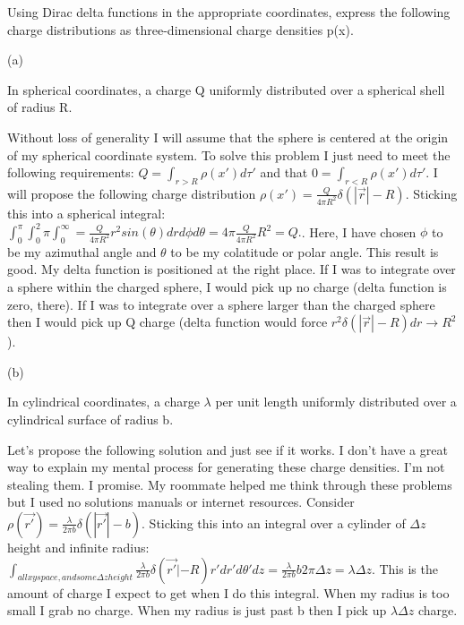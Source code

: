 \begin{homeworkProblem}

Using Dirac delta functions in the appropriate coordinates, express the following 
charge distributions as three-dimensional charge densities p(x). 

\begin{homeworkSection}{(a)} 

In spherical coordinates, a charge Q uniformly distributed over a spherical 
shell of radius R. 

Without loss of generality I will assume that the sphere is centered at the origin of my spherical coordinate system. To solve this problem I just need to meet the following requirements: $Q = \int_{r>R} \rho(x')d\tau'$ and that $0 = \int_{r<R} \rho(x')d\tau '$. I will propose the following charge distribution $\rho(x') = \frac{Q}{4\pi R^2} \delta(|\vec{r}|-R)$. Sticking this into a spherical integral: $\int_0^\pi \int_0^2\pi \int_0^\infty = \frac{Q}{4\pi R^2} r^2 sin(\theta) dr d\phi d\theta = 4\pi \frac{Q}{4\pi R^2}R^2 = Q.$. Here, I have chosen $\phi$ to be my azimuthal angle and $\theta$ to be my colatitude or polar angle. This result is good. My delta function is positioned at the right place.  If I was to integrate over a sphere within the charged sphere, I would pick up no charge (delta function is zero, there). If I was to integrate over a sphere larger than the charged sphere then I would pick up Q charge (delta function would force $r^2 \delta(|\vec{r}|-R) dr \rightarrow R^2$).

\end{homeworkSection}

\begin{homeworkSection}{(b)}

In cylindrical coordinates, a charge $\lambda$ per unit length uniformly distributed 
over a cylindrical surface of radius b. 

Let's propose the following solution and just see if it works. I don't have a great way to explain my mental process for generating these charge densities. I'm not stealing them. I promise. My roommate helped me think through these problems but I used no solutions manuals or internet resources. Consider $\rho(\vec{r'}) = \frac{\lambda}{2\pi b} \delta(|\vec{r'}|-b)$. Sticking this into an integral over a cylinder of $\Delta z$ height and infinite radius: $\int_{all xy space, and some \Delta z height} \frac{\lambda}{2\pi b} \delta(\vec{r'}|-R) r' dr' d\theta' dz = \frac{\lambda}{2\pi b} b 2\pi \Delta z = \lambda \Delta z$. This is the amount of charge I expect to get when I do this integral. When my radius is too small I grab no charge. When my radius is just past b then I pick up $\lambda \Delta z$ charge.


\end{homeworkSection}
\end{homeworkProblem}
